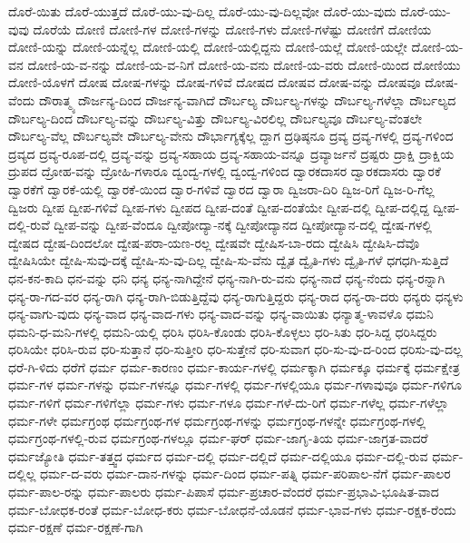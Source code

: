 {ದೊರೆ-ಯಿತು
ದೊರೆ-ಯುತ್ತದೆ
ದೊರೆ-ಯು-ವು-ದಿಲ್ಲ
ದೊರೆ-ಯು-ವು-ದಿಲ್ಲವೋ
ದೊರೆ-ಯು-ವುದು
ದೊರೆ-ಯು-ವುವು
ದೊರೆಯೆ
ದೋಣಿ
ದೋಣಿ-ಗಳ
ದೋಣಿ-ಗಳನ್ನು
ದೋಣಿ-ಗಳು
ದೋಣಿ-ಗಳೆಷ್ಟು
ದೋಣಿಗೆ
ದೋಣಿಯ
ದೋಣಿ-ಯನ್ನು
ದೋಣಿ-ಯನ್ನೆಲ್ಲ
ದೋಣಿ-ಯಲ್ಲಿ
ದೋಣಿ-ಯಲ್ಲಿದ್ದನು
ದೋಣಿ-ಯಲ್ಲೆ
ದೋಣಿ-ಯಲ್ಲೇ
ದೋಣಿ-ಯ-ವನ
ದೋಣಿ-ಯ-ವ-ನನ್ನು
ದೋಣಿ-ಯ-ವ-ನಿಗೆ
ದೋಣಿ-ಯ-ವನು
ದೋಣಿ-ಯ-ವರು
ದೋಣಿ-ಯಿಂದ
ದೋಣಿಯು
ದೋಣಿ-ಯೊಳಗೆ
ದೋಷ
ದೋಷ-ಗಳನ್ನು
ದೋಷ-ಗಳಿವೆ
ದೋಷದ
ದೋಷವ
ದೋಷ-ವನ್ನು
ದೋಷವೂ
ದೋಷ-ವೆಂದು
ದೌರಾತ್ಮ್ಯ
ದೌರ್ಜನ್ಯ-ದಿಂದ
ದೌರ್ಜನ್ಯ-ವಾಗಿದೆ
ದೌರ್ಬಲ್ಯ
ದೌರ್ಬಲ್ಯ-ಗಳನ್ನು
ದೌರ್ಬಲ್ಯ-ಗಳೆಲ್ಲಾ
ದೌರ್ಬಲ್ಯದ
ದೌರ್ಬಲ್ಯ-ದಿಂದ
ದೌರ್ಬಲ್ಯ-ವನ್ನು
ದೌರ್ಬಲ್ಯ-ವಿತ್ತು
ದೌರ್ಬಲ್ಯ-ವಿರಲಿಲ್ಲ
ದೌರ್ಬಲ್ಯವೂ
ದೌರ್ಬಲ್ಯ-ವೆಂತಲೇ
ದೌರ್ಬಲ್ಯ-ವೆಲ್ಲ
ದೌರ್ಬಲ್ಯವೇ
ದೌರ್ಬಲ್ಯ-ವೇನು
ದೌರ್ಭಾಗ್ಯಕ್ಕೆಲ್ಲ
ದ್ದಾಗ
ದ್ರಢಿಷ್ಠನೂ
ದ್ರವ್ಯ
ದ್ರವ್ಯ-ಗಳಲ್ಲಿ
ದ್ರವ್ಯ-ಗಳಿಂದ
ದ್ರವ್ಯದ
ದ್ರವ್ಯ-ರೂಪ-ದಲ್ಲಿ
ದ್ರವ್ಯ-ವನ್ನು
ದ್ರವ್ಯ-ಸಹಾಯ
ದ್ರವ್ಯ-ಸಹಾಯ-ವನ್ನೂ
ದ್ರವ್ಯಾರ್ಜನೆ
ದ್ರಷ್ಟರು
ದ್ರಾಕ್ಷಿ
ದ್ರಾಕ್ಷಿಯ
ದ್ರುಪದ
ದ್ರೋಹ-ವನ್ನು
ದ್ರೋಹಿ-ಗಳಾರೂ
ದ್ವಂದ್ವ-ಗಳಲ್ಲಿ
ದ್ವಂದ್ವ-ಗಳಿಂದ
ದ್ವಾರಕದಾಸರ
ದ್ವಾರಕದಾಸರು
ದ್ವಾರಕೆ
ದ್ವಾರಕೆಗೆ
ದ್ವಾರಕೆ-ಯಲ್ಲಿ
ದ್ವಾರಕೆ-ಯಿಂದ
ದ್ವಾರ-ಗಳಿವೆ
ದ್ವಾರದ
ದ್ವಾರಾ
ದ್ವಿಜರಾ-ದಿರಿ
ದ್ವಿಜ-ರಿಗೆ
ದ್ವಿಜ-ರಿ-ಗೆಲ್ಲ
ದ್ವಿಜರು
ದ್ವೀಪ
ದ್ವೀಪ-ಗಳಿವೆ
ದ್ವೀಪ-ಗಳು
ದ್ವೀಪದ
ದ್ವೀಪ-ದಂತೆ
ದ್ವೀಪ-ದಂತೆಯೇ
ದ್ವೀಪ-ದಲ್ಲಿ
ದ್ವೀಪ-ದಲ್ಲಿದ್ದ
ದ್ವೀಪ-ದಲ್ಲಿ-ರುವೆ
ದ್ವೀಪ-ವನ್ನು
ದ್ವೀಪ-ವೆಂದೂ
ದ್ವೀಪೋದ್ಯಾ-ನಕ್ಕೆ
ದ್ವೀಪೋದ್ಯಾನದ
ದ್ವೀಪೋದ್ಯಾನ-ದಲ್ಲಿ
ದ್ವೇಷ-ಗಳಲ್ಲಿ
ದ್ವೇಷದ
ದ್ವೇಷ-ದಿಂದಲೋ
ದ್ವೇಷ-ಪರಾ-ಯಣ-ರಲ್ಲ
ದ್ವೇಷವೇ
ದ್ವೇಷಿಸ-ಬಾ-ರದು
ದ್ವೇಷಿಸಿ
ದ್ವೇಷಿಸಿ-ದೆವೊ
ದ್ವೇಷಿಸಿಯೇ
ದ್ವೇಷಿ-ಸುವು-ದಕ್ಕೆ
ದ್ವೇಷಿ-ಸು-ವು-ದಿಲ್ಲ
ದ್ವೇಷಿ-ಸು-ವೆನು
ದ್ವೈತ
ದ್ವೈತಿ-ಗಳು
ದ್ವೈತಿ-ಗಳೆ
ಧಗಧಗಿ-ಸುತ್ತಿದೆ
ಧನ-ಕನ-ಕಾದಿ
ಧನ-ವನ್ನು
ಧನಿ
ಧನ್ಯ
ಧನ್ಯ-ನಾಗಿದ್ದೇನೆ
ಧನ್ಯ-ನಾಗಿ-ರು-ವನು
ಧನ್ಯ-ನಾದೆ
ಧನ್ಯ-ನೆಂದು
ಧನ್ಯ-ರನ್ನಾಗಿ
ಧನ್ಯ-ರಾ-ಗದ-ವರ
ಧನ್ಯ-ರಾಗಿ
ಧನ್ಯ-ರಾಗಿ-ಬಿಡುತ್ತಿದ್ದೆವು
ಧನ್ಯ-ರಾಗುತ್ತಿದ್ದರು
ಧನ್ಯ-ರಾದ
ಧನ್ಯ-ರಾ-ದರು
ಧನ್ಯರು
ಧನ್ಯಳು
ಧನ್ಯ-ವಾಗು-ವುದು
ಧನ್ಯ-ವಾದ
ಧನ್ಯ-ವಾದ-ಗಳು
ಧನ್ಯ-ವಾದ-ವನ್ನು
ಧನ್ಯ-ವಾಯಿತು
ಧನ್ಯಾತ್ಮ-ಳಾವಳೊ
ಧಮನಿ
ಧಮನಿ-ಧ-ಮನಿ-ಗಳಲ್ಲಿ
ಧಮನಿ-ಯಲ್ಲಿ
ಧರಿಸಿ
ಧರಿಸಿ-ಕೊಂಡು
ಧರಿಸಿ-ಕೊಳ್ಳಲು
ಧರಿ-ಸಿತು
ಧರಿ-ಸಿದ್ದ
ಧರಿಸಿದ್ದರು
ಧರಿಸಿಯೇ
ಧರಿಸಿ-ರುವ
ಧರಿ-ಸುತ್ತಾನೆ
ಧರಿ-ಸುತ್ತೀರಿ
ಧರಿ-ಸುತ್ತೇನೆ
ಧರಿ-ಸುವಾಗ
ಧರಿ-ಸು-ವು-ದ-ರಿಂದ
ಧರಿಸು-ವು-ದಲ್ಲ
ಧರೆ-ಗಿ-ಳಿದು
ಧರೆಗೆ
ಧರ್ಮ
ಧರ್ಮ-ಕಾರಣಂ
ಧರ್ಮ-ಕಾರ್ಯ-ಗಳಲ್ಲಿ
ಧರ್ಮಕ್ಕಾಗಿ
ಧರ್ಮಕ್ಕೂ
ಧರ್ಮಕ್ಕೆ
ಧರ್ಮಕ್ಷೇತ್ರ
ಧರ್ಮ-ಗಳ
ಧರ್ಮ-ಗಳನ್ನು
ಧರ್ಮ-ಗಳನ್ನೂ
ಧರ್ಮ-ಗಳಲ್ಲಿ
ಧರ್ಮ-ಗಳಲ್ಲಿಯೂ
ಧರ್ಮ-ಗಳಾವುವೂ
ಧರ್ಮ-ಗಳಿಗೂ
ಧರ್ಮ-ಗಳಿಗೆ
ಧರ್ಮ-ಗಳಿಗೆಲ್ಲಾ
ಧರ್ಮ-ಗಳು
ಧರ್ಮ-ಗಳೂ
ಧರ್ಮ-ಗಳೆ-ದು-ರಿಗೆ
ಧರ್ಮ-ಗಳೆಲ್ಲ
ಧರ್ಮ-ಗಳೆಲ್ಲಾ
ಧರ್ಮ-ಗಳೇ
ಧರ್ಮಗ್ರಂಥ
ಧರ್ಮಗ್ರಂಥ-ಗಳ
ಧರ್ಮಗ್ರಂಥ-ಗಳನ್ನು
ಧರ್ಮಗ್ರಂಥ-ಗಳನ್ನೇ
ಧರ್ಮಗ್ರಂಥ-ಗಳಲ್ಲಿ
ಧರ್ಮಗ್ರಂಥ-ಗಳಲ್ಲಿ-ರುವ
ಧರ್ಮಗ್ರಂಥ-ಗಳಲ್ಲೂ
ಧರ್ಮ-ಘರ್
ಧರ್ಮ-ಜಾಗೃ-ತಿಯ
ಧರ್ಮ-ಜಾಗ್ರತ-ವಾದರೆ
ಧರ್ಮಜ್ಯೋತಿ
ಧರ್ಮ-ತತ್ತ್ವದ
ಧರ್ಮದ
ಧರ್ಮ-ದಲ್ಲಿ
ಧರ್ಮ-ದಲ್ಲಿದೆ
ಧರ್ಮ-ದಲ್ಲಿಯೂ
ಧರ್ಮ-ದಲ್ಲಿ-ರುವ
ಧರ್ಮ-ದಲ್ಲಿಲ್ಲ
ಧರ್ಮ-ದ-ವರು
ಧರ್ಮ-ದಾನ-ಗಳನ್ನು
ಧರ್ಮ-ದಿಂದ
ಧರ್ಮ-ಪತ್ನಿ
ಧರ್ಮ-ಪರಿಪಾಲ-ನೆಗೆ
ಧರ್ಮ-ಪಾಲರ
ಧರ್ಮ-ಪಾಲ-ರನ್ನು
ಧರ್ಮ-ಪಾಲರು
ಧರ್ಮ-ಪಿಪಾಸೆ
ಧರ್ಮ-ಪ್ರಚಾರ-ವೆಂದರೆ
ಧರ್ಮ-ಪ್ರಭಾವಿ-ಭೂಷಿತ-ವಾದ
ಧರ್ಮ-ಬೋಧಕ-ರಂತೆ
ಧರ್ಮ-ಬೋಧ-ಕರು
ಧರ್ಮ-ಬೋಧನೆ-ಯೊಡನೆ
ಧರ್ಮ-ಭಾವ-ಗಳು
ಧರ್ಮ-ರಕ್ಷಕ-ರೆಂದು
ಧರ್ಮ-ರಕ್ಷಣೆ
ಧರ್ಮ-ರಕ್ಷಣೆ-ಗಾಗಿ
}

